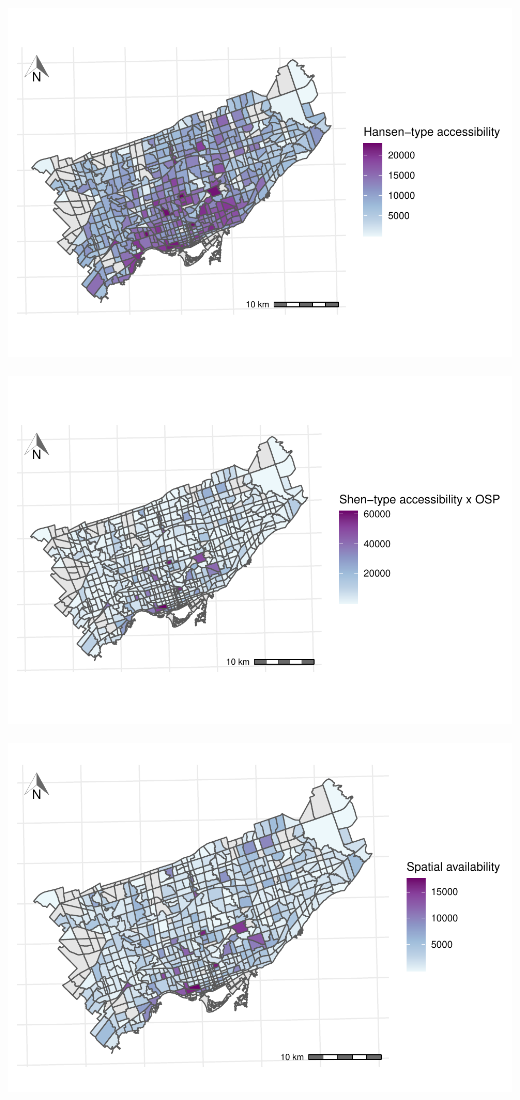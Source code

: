 \documentclass[]{elsarticle} %
\begin{document}
\includegraphics[width=1\linewidth]{Spatial-Availability-Refreshed_files/figure-latex/absolute-accessibility-plot-S_i-1}

\includegraphics[width=1\linewidth]{Spatial-Availability-Refreshed_files/figure-latex/absolute-accessibility-plot-A2_i-1}

\includegraphics[width=1\linewidth]{Spatial-Availability-Refreshed_files/figure-latex/absolute-accessibility-plot-V_i-1}
\end{document}
